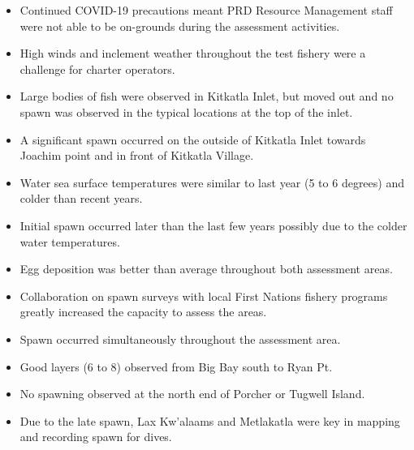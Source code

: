 \begin{itemize}
\item Continued COVID-19 precautions meant PRD Resource Management staff were
not able to be on-grounds during the assessment activities.
\item High winds and inclement weather throughout the test fishery were a challenge for charter operators.
\item Large bodies of fish were observed in Kitkatla Inlet, but
moved out and no spawn was observed in the typical locations at the top of the inlet.
\item A significant spawn occurred on the outside of Kitkatla Inlet
towards Joachim point and in front of Kitkatla Village.
\item Water sea surface temperatures were similar to last year (5 to 6 degrees) and colder than recent years.
\item Initial spawn occurred later than the last few years possibly due to the colder water temperatures.
\item Egg deposition was better than average throughout both assessment areas.
\item Collaboration on spawn surveys with local First Nations fishery programs
greatly increased the capacity to assess the areas.

\item Spawn occurred simultaneously throughout the assessment area.
\item Good layers (6 to 8) observed from Big Bay south to Ryan Pt.
\item No spawning observed at the north end of Porcher or Tugwell Island.
\item Due to the late spawn,
Lax Kw'alaams and Metlakatla were key in mapping and recording spawn for dives.
\end{itemize}